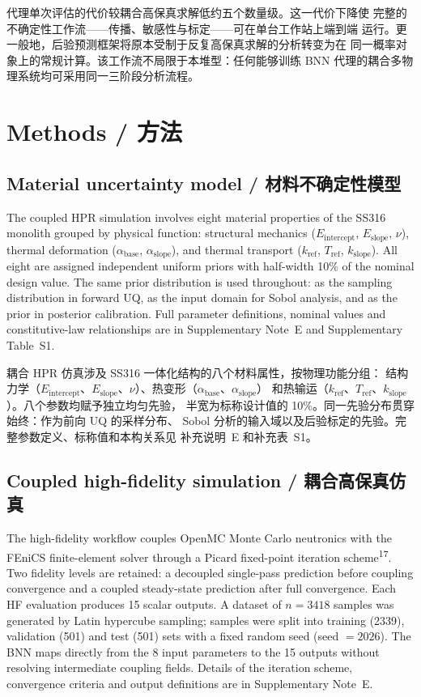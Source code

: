 \documentclass[11pt,a4paper]{article}
\newcommand{\Eint}{\ensuremath{E_{\mathrm{intercept}}}}
\newcommand{\Eslope}{\ensuremath{E_{\mathrm{slope}}}}
\newcommand{\abase}{\ensuremath{\alpha_{\mathrm{base}}}}
\newcommand{\aslope}{\ensuremath{\alpha_{\mathrm{slope}}}}
\newcommand{\kref}{\ensuremath{k_{\mathrm{ref}}}}
\newcommand{\Tref}{\ensuremath{T_{\mathrm{ref}}}}
\newcommand{\kslope}{\ensuremath{k_{\mathrm{slope}}}}
\begin{document}
代理单次评估的代价较耦合高保真求解低约五个数量级。这一代价下降使
完整的不确定性工作流——传播、敏感性与标定——可在单台工作站上端到端
运行。更一般地，后验预测框架将原本受制于反复高保真求解的分析转变为在
同一概率对象上的常规计算。该工作流不局限于本堆型：任何能够训练 BNN
代理的耦合多物理系统均可采用同一三阶段分析流程。

\section{Methods / 方法}

\subsection{Material uncertainty model / 材料不确定性模型}

The coupled HPR simulation involves eight material properties of the
SS316 monolith grouped by physical function: structural mechanics
(\Eint{}, \Eslope{}, $\nu$), thermal deformation (\abase{}, \aslope{}),
and thermal transport (\kref{}, \Tref{}, \kslope{}). All eight are
assigned independent uniform priors with half-width 10\% of the nominal
design value. The same prior distribution is used throughout: as the
sampling distribution in forward UQ, as the input domain for Sobol
analysis, and as the prior in posterior calibration. Full parameter
definitions, nominal values and constitutive-law relationships are in
Supplementary Note~E and Supplementary Table~S1.

耦合 HPR 仿真涉及 SS316 一体化结构的八个材料属性，按物理功能分组：
结构力学（\Eint{}、\Eslope{}、$\nu$）、热变形（\abase{}、\aslope{}）
和热输运（\kref{}、\Tref{}、\kslope{}）。八个参数均赋予独立均匀先验，
半宽为标称设计值的 10\%。同一先验分布贯穿始终：作为前向 UQ 的采样分布、
Sobol 分析的输入域以及后验标定的先验。完整参数定义、标称值和本构关系见
补充说明~E 和补充表~S1。

\subsection{Coupled high-fidelity simulation / 耦合高保真仿真}

The high-fidelity workflow couples OpenMC Monte Carlo neutronics with the
FEniCS finite-element solver through a Picard fixed-point iteration
scheme\textsuperscript{17}. Two fidelity levels are retained: a decoupled
single-pass prediction before coupling convergence and a coupled
steady-state prediction after full convergence. Each HF evaluation
produces 15 scalar outputs. A dataset of $n = 3418$ samples was
generated by Latin hypercube sampling; samples were split into training
(2339), validation (501) and test (501) sets with a fixed random seed
(seed $= 2026$). The BNN maps directly from the 8 input parameters to
the 15 outputs without resolving intermediate coupling fields. Details
of the iteration scheme, convergence criteria and output definitions are
in Supplementary Note~E.
\end{document}
